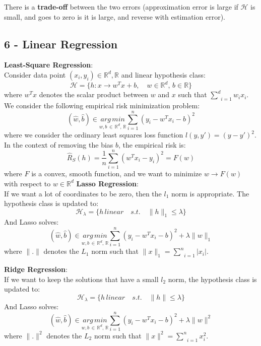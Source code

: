 \documentclass{homework}
\begin{document}
There is a \textbf{trade-off} between the two errors (approximation error is large if $\mathcal{H}$ is small, and goes to zero is it is large, and reverse with estimation error).
\subsection*{6 - Linear Regression}
\textbf{Least-Square Regression}:\\
Consider data point $(x_i, y_i)\in\mathbb{R}^d,\mathbb{R}$ and linear hypothesis class:
$$\mathcal{H}=\{h:x\rightarrow w^Tx+b,\quad w\in\mathbb{R}^d,\, b\in\mathbb{R}\}$$
where $w^Tx$ denotes the scalar product between $w$ and $x$ such that $\underset{i=1}{\overset{d}{\sum}}w_ix_i$.
We consider the following empirical risk minimization problem:
$$(\hat{w},\hat{b})\in\underset{w,b\,\in\,\mathbb{R}^d,\,\mathbb{R}}{arg\,min}\underset{i=1}{\overset{n}{\sum}}(y_i-w^Tx_i-b)^2$$
where we consider the ordinary least squares loss function $l(y,y') = (y-y')^2$.\\
In the context of removing the bias $b$, the empirical risk is:
$$\hat{R}_S(h)=\frac{1}{n}\underset{i=1}{\overset{n}{\sum}}(w^Tx_i-y_i)^2=F(w)$$
where $F$ is a convex, smooth function, and we want to minimize $w\rightarrow F(w)$ with respect to $w\in\mathbb{R}^d$
\textbf{Lasso Regression}:\\
If we want a lot of coordinates to be zero, then the $l_1$ norm is appropriate. The hypothesis class is updated to:
$$\mathcal{H}_\lambda=\{h\,linear\quad s.t. \quad \lVert h\rVert_1\le\lambda\}$$
And Lasso solves:
$$(\hat{w},\hat{b})\in\underset{w,b\,\in\,\mathbb{R}^d,\,\mathbb{R}}{arg\,min}\underset{i=1}{\overset{n}{\sum}}(y_i-w^Tx_i-b)^2+\lambda\lVert w\rVert_1$$
where $\lVert.\rVert$ denotes the $L_1$ norm such that $\lVert x\rVert_1=\underset{i=1}{\overset{n}{\sum}}|x_i|$.

\textbf{Ridge Regression}:\\
If we want to keep the solutions that have a small $l_2$ norm, the hypothesis class is updated to:
$$\mathcal{H}_\lambda=\{h\,linear\quad s.t. \quad \lVert h\rVert\le\lambda\}$$
And Lasso solves:
$$(\hat{w},\hat{b})\in\underset{w,b\,\in\,\mathbb{R}^d,\,\mathbb{R}}{arg\,min}\underset{i=1}{\overset{n}{\sum}}(y_i-w^Tx_i-b)^2+\lambda\lVert w\rVert^2$$
where $\lVert.\rVert^2$ denotes the $L_2$ norm such that $\lVert x\rVert^2=\underset{i=1}{\overset{n}{\sum}}x_i^2$.
\end{document}
